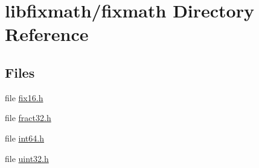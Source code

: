 \hypertarget{dir_000004}{}\section{libfixmath/fixmath Directory Reference}
\label{dir_000004}
\subsection*{Files}
\begin{DoxyCompactItemize}
\item 
file \hyperlink{fix16_8h}{fix16.\+h}
\item 
file \hyperlink{fract32_8h}{fract32.\+h}
\item 
file \hyperlink{int64_8h}{int64.\+h}
\item 
file \hyperlink{uint32_8h}{uint32.\+h}
\end{DoxyCompactItemize}
